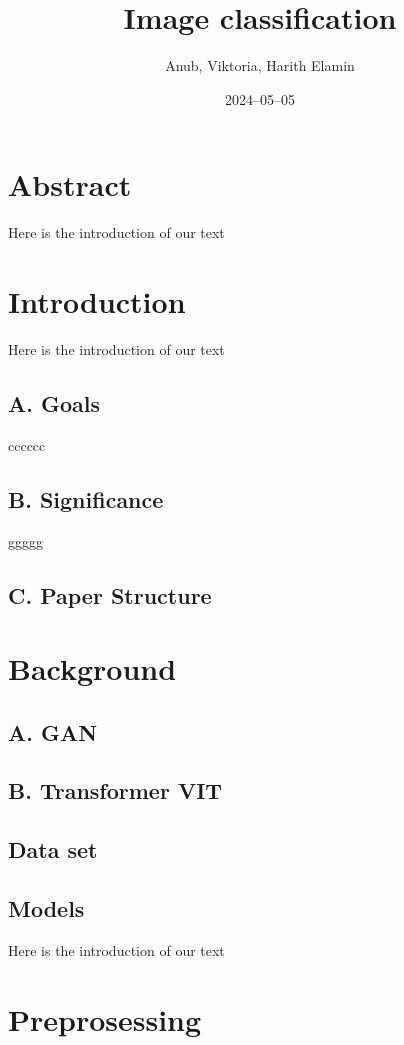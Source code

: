 \documentclass[12pt]{article}
\title{Image classification}
\author{Anub, Viktoria, Harith Elamin}
\date{2024–05–05}
\begin{document}
\maketitle

\section{Abstract}

Here is the introduction of our text

\section{Introduction}

Here is the introduction of our text
\subsection*{A. Goals}
cccccc
\subsection*{B. Significance}
ggggg
\subsection*{C. Paper Structure}

\section{Background}
\subsection*{A. GAN}
\subsection*{B. Transformer VIT}
\subsection{Data set}
\subsection*{Models}
\sus

Here is the introduction of our text

\section{Preprosessing}
\end{document}
